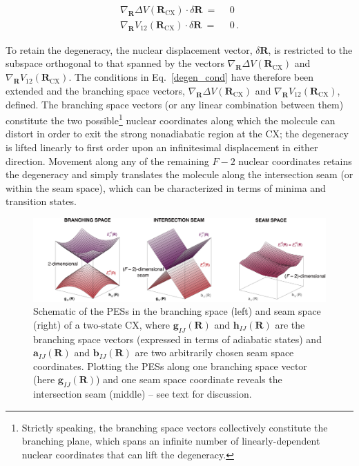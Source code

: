 \documentclass[9pt,bestpractices]{livecoms}
\newcommand{\R}{\mathbf{R}}
\newcommand{\g}[2]{\mathbf{g}_{#1#2}(\R)}
\newcommand{\h}[2]{\mathbf{h}_{#1#2}(\R)}
\begin{document}
\begin{equation}
\label{new_degen_cond}
\begin{split}
    \nabla_{\R} \Delta V(\R_{\text{CX}}) \cdot \delta \R \: =& \:\: 0\\
    \nabla_{\R} V_{12}(\R_{\text{CX}}) \cdot \delta \R \: =& \:\: 0 \, .
\end{split}
\end{equation}

To retain the degeneracy, the nuclear displacement vector, $\delta \R$, is restricted to the subspace orthogonal to that spanned by the vectors $\nabla_{\R} \Delta V(\R_{\text{CX}})$ and $\nabla_{\R} V_{12}(\R_{\text{CX}})$.
The conditions in Eq.~\eqref{degen_cond} have therefore been extended and the branching space vectors, $\nabla_{\R} \Delta V(\R_{\text{CX}})$ and $\nabla_{\R} V_{12}(\R_{\text{CX}})$, defined.
The branching space vectors (or any linear combination between them)\cite{boeije_one-mode_2023} constitute the two possible\footnote{
Strictly speaking, the branching space vectors collectively constitute the branching plane, which spans an infinite number of linearly-dependent nuclear coordinates that can lift the degeneracy. 
} nuclear coordinates along which the molecule can distort in order to exit the strong nonadiabatic region at the CX; the degeneracy is lifted linearly to first order upon an infinitesimal displacement in either direction.
Movement along any of the remaining $F - 2$ nuclear coordinates retains the degeneracy and simply translates the molecule along the intersection seam (or within the seam space), which can be characterized in terms of minima and transition states.\cite{tuna2015assessment,pieri2021namdreactor}

\begin{figure}[h!]
    \centering
    \includegraphics[width=\textwidth]{figures/BS_IS_SS.png}
    \caption{Schematic of the PESs in the branching space (left) and seam space (right) of a two-state CX, where $\g{I}{J}$ and $\h{I}{J}$ are the branching space vectors (expressed in terms of adiabatic states) and $\mathbf{a}_{IJ}(\R)$ and $\mathbf{b}_{IJ}(\R)$ are two arbitrarily chosen seam space coordinates. Plotting the PESs along one branching space vector (here $\g{I}{J}$) and one seam space coordinate reveals the intersection seam (middle) -- see text for discussion.}
    \label{fig:branch_vs_seam}
\end{figure}
\end{document}

